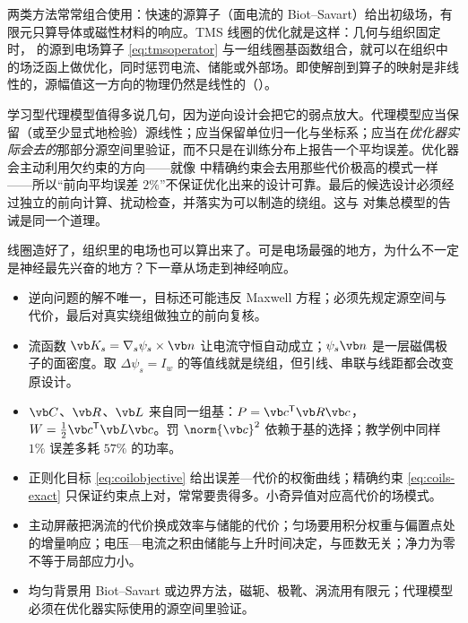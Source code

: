 两类方法常常组合使用：快速的源算子（面电流的 Biot--Savart）给出初级场，有限元只算导体或磁性材料的响应。TMS 线圈的优化就是这样：几何与组织固定时， 的源到电场算子 \eqref{eq:tmsoperator} 与一组线圈基函数组合，就可以在组织中的场泛函上做优化，同时惩罚电流、储能或外部场。即使解剖到算子的映射是非线性的，源幅值这一方向的物理仍然是线性的（）。

学习型代理模型值得多说几句，因为逆向设计会把它的弱点放大。代理模型应当保留（或至少显式地检验）源线性；应当保留单位归一化与坐标系；应当在\emph{优化器实际会去的}那部分源空间里验证，而不只是在训练分布上报告一个平均误差。优化器会主动利用欠约束的方向——就像 中精确约束会去用那些代价极高的模式一样——所以“前向平均误差 $2\%$”不保证优化出来的设计可靠。最后的候选设计必须经过独立的前向计算、扰动检查，并落实为可以制造的绕组。这与 对集总模型的告诫是同一个道理。

线圈造好了，组织里的电场也可以算出来了。可是电场最强的地方，为什么不一定是神经最先兴奋的地方？下一章从场走到神经响应。

\begin{takeaways}
\begin{itemize}
\item 逆向问题的解不唯一，目标还可能违反 Maxwell 方程；必须先规定源空间与代价，最后对真实绕组做独立的前向复核。
\item 流函数 $\vb K_s=\nabla_s\psi_s\times\vb n$ 让电流守恒自动成立；$\psi_s\vb n$ 是一层磁偶极子的面密度。取 $\Delta\psi_s=I_w$ 的等值线就是绕组，但引线、串联与线距都会改变原设计。
\item $\vb C$、$\vb R$、$\vb L$ 来自同一组基：$P=\vb c^{\mathsf T}\vb R\vb c$，$W=\tfrac12\vb c^{\mathsf T}\vb L\vb c$。罚 $\norm{\vb c}^2$ 依赖于基的选择；教学例中同样 $1\%$ 误差多耗 $57\%$ 的功率。
\item 正则化目标 \eqref{eq:coilobjective} 给出误差—代价的权衡曲线；精确约束 \eqref{eq:coils-exact} 只保证约束点上对，常常要贵得多。小奇异值对应高代价的场模式。
\item 主动屏蔽把涡流的代价换成效率与储能的代价；匀场要用积分权重与偏置点处的增量响应；电压—电流之积由储能与上升时间决定，与匝数无关；净力为零不等于局部应力小。
\item 均匀背景用 Biot--Savart 或边界方法，磁轭、极靴、涡流用有限元；代理模型必须在优化器实际使用的源空间里验证。
\end{itemize}
\end{takeaways}

